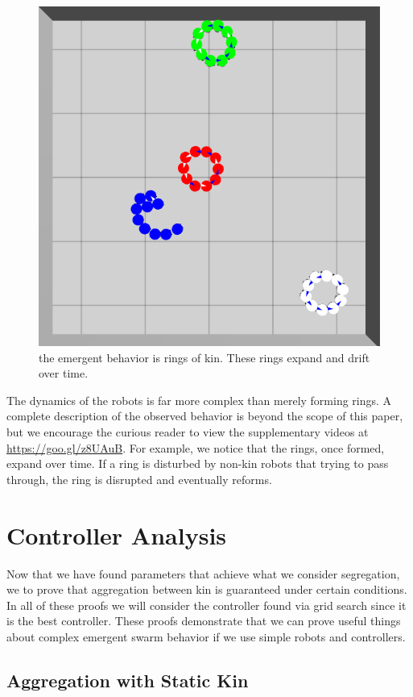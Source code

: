 \documentclass[conference]{IEEEtran}
\begin{document}
    \begin{figure}
      \centering
      \includegraphics[width=0.7\linewidth]{./images/rings_example.png}
      \caption{the emergent behavior is rings of kin. These rings expand and drift over time.}
      \label{fig:rings}
    \end{figure}

    The dynamics of the robots is far more complex than merely forming rings. A complete description of the observed behavior is beyond the scope of this paper, but we encourage the curious reader to view the supplementary videos at \href{https://www.youtube.com/playlist?list=PL9HqYJ1IkIKVX9EsT5BY9LnBsBPTjc5bB}{https://goo.gl/z8UAuB}. For example, we notice that the rings, once formed, expand over time. If a ring is disturbed by non-kin robots that trying to pass through, the ring is disrupted and eventually reforms.

\section{Controller Analysis}

  Now that we have found parameters that achieve what we consider segregation, we to prove that aggregation between kin is guaranteed under certain conditions. In all of these proofs we will consider the controller found via grid search since it is the best controller. These proofs demonstrate that we can prove useful things about complex emergent swarm behavior if we use simple robots and controllers.

  \subsection{Aggregation with Static Kin}
\end{document}
